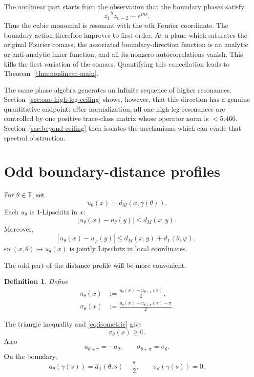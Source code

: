 \documentclass[11pt]{article}
\newtheorem{definition}[theorem]{Definition}
\newcommand{\T}{\mathbb T}
\begin{document}
The nonlinear part starts from the observation that the boundary phases
satisfy
\[
 \overline{z_1}^{\,2}z_{n+2}\sim e^{ins}.
\]
Thus the cubic monomial is resonant with the $n$th Fourier coordinate.
The boundary action therefore improves to first order.  At a plane which
saturates the original Fourier comass, the associated boundary-direction
function is an analytic or anti-analytic inner function, and all its
nonzero autocorrelations vanish.  This kills the first variation of the
comass.  Quantifying this cancellation leads to
Theorem~\ref{thm:nonlinear-main}.

The same phase algebra generates an infinite sequence of higher resonances.
Section~\ref{sec:one-high-leg-ceiling} shows, however, that this direction has
a genuine quantitative endpoint: after normalization, all one-high-leg
resonances are controlled by one positive trace-class matrix whose operator
norm is $<5.466$.  Section~\ref{sec:beyond-ceiling} then isolates the
mechanisms which can evade that spectral obstruction.

\section{Odd boundary-distance profiles}

For $\theta\in\T$, set
\begin{equation}\label{eq:u}
        u_\theta(x)=d_M(x,\gamma(\theta)).
\end{equation}
Each $u_\theta$ is $1$-Lipschitz in $x$:
\[
        |u_\theta(x)-u_\theta(y)|\le d_M(x,y).
\]
Moreover,
\[
        |u_\theta(x)-u_\varphi(y)|
        \le d_M(x,y)+d_{\T}(\theta,\varphi),
\]
so $(x,\theta)\mapsto u_\theta(x)$ is jointly Lipschitz in local
coordinates.

The odd part of the distance profile will be more convenient.

\begin{definition}\label{def:odd-slack}
Define
\begin{align}
 a_\theta(x)
 &:=\frac{u_\theta(x)-u_{\theta+\pi}(x)}{2},
 \label{eq:oddprofile}\\
 \sigma_\theta(x)
 &:=\frac{u_\theta(x)+u_{\theta+\pi}(x)-\pi}{2}.
 \label{eq:slack}
\end{align}
\end{definition}

The triangle inequality and \eqref{eq:isometric} give
\[
        \sigma_\theta(x)\ge0.
\]
Also
\[
        a_{\theta+\pi}=-a_\theta,\qquad
        \sigma_{\theta+\pi}=\sigma_\theta.
\]
On the boundary,
\begin{equation}\label{eq:boundary-odd}
        a_\theta(\gamma(s))
        =d_{\T}(\theta,s)-\frac{\pi}{2},
        \qquad
        \sigma_\theta(\gamma(s))=0.
\end{equation}
\end{document}
